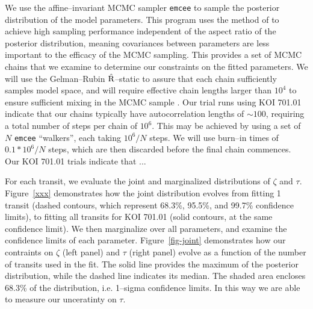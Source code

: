 We use the affine--invariant MCMC sampler {\tt emcee}
\citep{2013PASP..125..306F} to sample the posterior distribution of
the model parameters.  This program uses the method of
\cite{Goodman-Weare} to achieve high sampling performance independent
of the aspect ratio of the posterior distribution, meaning covariances
between parameters are less important to the efficacy of the MCMC
sampling.  This provides a set of MCMC chains that we examine to
determine our constraints on the fitted parameters.  We will use the
Gelman--Rubin $\hat{\rm R}$--static \citep{Gelman92} to assure that
each chain sufficiently samples model space, and will require
effective chain lengths larger than $10^4$ to ensure sufficient mixing
in the MCMC sample \cite[e.g.][]{2004PhRvD..69j3501T}.  Our trial runs
using KOI 701.01 indicate that our chains typically have
autocorrelation lengths of $\sim 100$, requiring a total number of
steps per chain of $10^6$.  This may be achieved by using a set of $N$
{\tt emcee} ``walkers'', each taking $10^6/N$ steps.  We will use
burn--in times of $0.1 * 10^6/N$ steps, which are then discarded
before the final chain commences.  Our KOI 701.01 trials indicate that
...

For each transit, we evaluate the joint and marginalized distributions
of $\zeta$ and $\tau$.  Figure~\ref{xxx} demonstrates how the joint
distribution evolves from fitting 1 transit (dashed contours, which
represent 68.3\%, 95.5\%, and 99.7\% confidence limits), to fitting
all transits for KOI 701.01 (solid contours, at the same confidence
limit).  We then marginalize over all parameters, and examine the
confidence limits of each parameter.  Figure~\ref{fig-joint}
demonstrates how our contraints on $\zeta$ (left panel) and $\tau$
(right panel) evolve as a function of the number of transits used in
the fit.  The solid line provides the maximum of the posterior
distribution, while the dashed line indicates its median.  The shaded
area encloses 68.3\% of the distribution, i.e. 1--sigma confidence
limits.  In this way we are able to measure our unceratinty on $\tau$.

